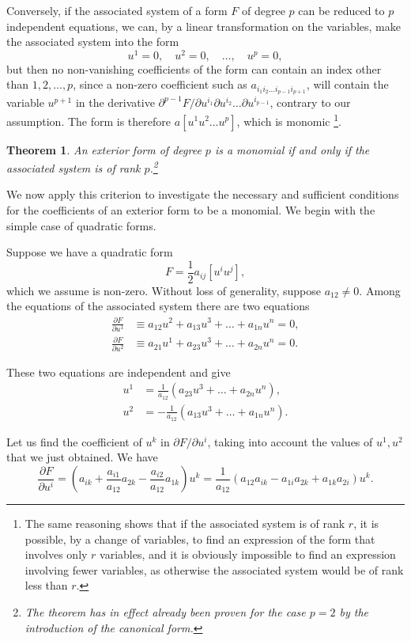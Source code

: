 \documentclass[leqno,11pt]{book}
\numberwithin{equation}{chapter}
\newcommand{\pd}{\partial}
\theoremstyle{shape1}
\newtheorem*{thm*}{\hspace{15pt}Theorem}
\theoremstyle{shape0}
\theoremstyle{shape2}
\theoremstyle{definition}
\begin{document}
Conversely, if the associated system of a form $F$ of degree $p$ can be reduced to $p$ independent equations, we can, by a linear transformation on the variables, make the associated system into the form
\[
u^{1}=0,\quad u^{2}=0,\quad\dots,\quad u^{p}=0,
\]
but then no non-vanishing coefficients of the form can contain an index other than $1,2,\dots,p$, since a non-zero coefficient such as $a_{i_{1}i_{2}\dots i_{p-1} i_{p+1}}$, will contain the variable $u^{p+1}$ in the derivative $\pd^{p-1}F/\pd u^{i_{1}}\pd u^{i_{2}}\dots\pd u^{i_{p-1}}$, contrary to our assumption. The form is therefore $a[u^{1}u^{2}\dots u^{p}]$, which is monomic \footnote{The same reasoning shows that if the associated system is of rank $r$, it is possible, by a change of variables, to find an expression of the form that involves only $r$ variables, and it is obviously impossible to find an expression involving fewer variables, as otherwise the associated system would be of rank less than $r$.}.
\begin{thm*}
  An exterior form of degree $p$ is a monomial if and only if the associated system is of rank $p$.\footnote{The theorem has in effect already been proven for the case $p=2$ by the introduction of the canonical form.}
\end{thm*}

\vspace{12pt}\fsec We now apply this criterion to investigate the necessary and sufficient conditions for the coefficients of an exterior form to be a monomial. We begin with the simple case of quadratic forms.

Suppose we have a quadratic form
\[
F=\frac{1}{2}a_{ij}[u^{i}u^{j}],
\]
which we assume is non-zero. Without loss of generality, suppose $a_{12}\neq 0$. Among the equations of the associated system there are two equations
\begin{align*}
  \frac{\pd F}{\pd u^{1}}&\equiv a_{12}u^{2}+a_{13}u^{3}+\dots+a_{1n}u^{n}=0,\\
  \frac{\pd F}{\pd u^{2}}&\equiv a_{21}u^{1}+a_{23}u^{3}+\dots+a_{2n}u^{n}=0.
\end{align*}

These two equations are independent and give
\begin{align*}
  u^{1}&=\frac{1}{a_{12}}(a_{23}u^{3}+\dots+a_{2n}u^{n}),\\
  u^{2}&=-\frac{1}{a_{12}}(a_{13}u^{3}+\dots+a_{1n}u^{n}).
\end{align*}

Let us find the coefficient of $u^{k}$ in $\pd F/\pd u^{i}$, taking into account the values of $u^{1},u^{2}$ that we just obtained. We have
\[
\frac{\pd F}{\pd u^{i}}=\left(a_{ik}+\frac{a_{i1}}{a_{12}}a_{2k}-\frac{a_{i2}}{a_{12}}a_{1k}\right)u^{k}=\frac{1}{a_{12}}(a_{12}a_{ik}-a_{1i}a_{2k}+a_{1k}a_{2i})u^{k}.
\]
\end{document}
